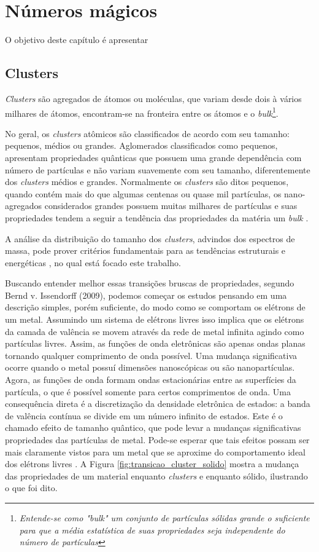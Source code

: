 \chapter{Números mágicos}
\label{c2}

O objetivo deste capítulo é apresentar

\section{Clusters}
\label{c2-clusters}

\textit{Clusters} são agregados de átomos ou moléculas, que variam desde dois à vários milhares de átomos, encontram-se na fronteira entre os átomos e o \textit{bulk}\footnote{\textit{Entende-se como "bulk" um conjunto de partículas sólidas grande o suficiente para que a média estatística de suas propriedades seja independente do número de partículas\cite{bulk}}}\cite{Heer,Brack}. 

No geral, os \textit{clusters} atômicos são classificados de acordo com seu tamanho: pequenos, médios ou grandes. Aglomerados classificados como pequenos, apresentam propriedades quânticas que possuem uma grande dependência com número de partículas e não variam suavemente com seu tamanho, diferentemente dos \textit{clusters} médios e grandes. Normalmente os \textit{clusters} são ditos pequenos, quando contém mais do que algumas centenas ou quase mil partículas, os nano-agregados considerados grandes possuem muitas milhares de partículas e suas propriedades tendem a seguir a tendência das propriedades da matéria um \textit{bulk} \cite{livro_cluster}.

A análise da distribuição do tamanho dos \textit{clusters}, advindos dos espectros
de massa, pode prover critérios fundamentais para as tendências estruturais e energéticas \cite{dissertacao_anderson}, no qual está focado este trabalho.

Buscando entender melhor essas transições bruscas de propriedades, segundo Bernd v. Issendorff (2009), podemos começar os estudos pensando em uma descrição simples, porém suficiente, do modo como se comportam os elétrons de um metal. Assumindo um sistema de elétrons livres isso implica que os elétrons da camada de valência se movem através da rede de metal infinita agindo como partículas livres. Assim, as funções de onda eletrônicas são apenas ondas planas tornando qualquer comprimento de onda possível. Uma mudança significativa ocorre quando o metal possuí dimensões nanoscópicas ou são nanopartículas. Agora, as funções de onda formam ondas estacionárias entre as superfícies da partícula, o que é possível somente para certos comprimentos de onda. Uma consequência direta é a discretização da densidade eletrônica de estados: a banda de valência contínua se divide em um número infinito de estados. Este é o chamado efeito de tamanho quântico, que pode levar a mudanças significativas propriedades das partículas de metal. Pode-se esperar que tais efeitos possam ser mais claramente vistos para um metal que se aproxime do comportamento ideal dos elétrons livres \cite{capitulo_livro_shell}. A Figura \ref{fig:transicao_cluster_solido} mostra a mudança das propriedades de um material enquanto \textit{clusters} e enquanto sólido, ilustrando o que foi dito.


